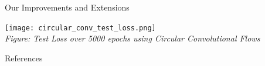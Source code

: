 \documentclass[final,hyperref={pdfpagelabels=false}]{beamer}
\begin{document}
\begin{frame}[t]
\begin{columns}[t]
\begin{column}{.3\textwidth}
\begin{block}{Our Improvements and Extensions}
	
	\end{block}
	
	\begin{center}
        \texttt{[image: circular\_conv\_test\_loss.png]}\\
        \textit{Figure: Test Loss over 5000 epochs using Circular Convolutional Flows}
      \end{center}

    \begin{block}{References}
      \nocite{*} %
      \linespread{0.928}\selectfont
      \footnotesize{
      }
    \end{block}

  \end{column} %

  \begin{column}{.02\textwidth}\end{column} %

\end{columns} %

\end{frame} %
\end{document}
